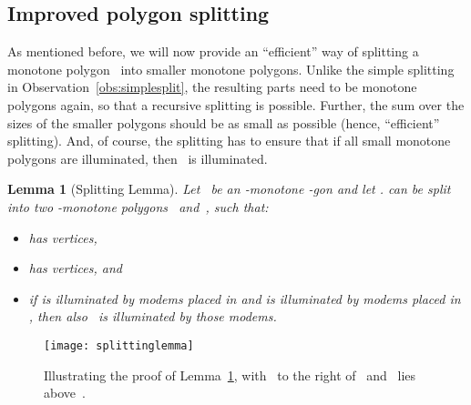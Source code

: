 \documentclass[A4]{article}
\newtheorem{lemma}[theorem]{Lemma}
\begin{document}
\subsection{Improved polygon splitting}
\label{sec:gmono-split}

As mentioned before, we will now provide an ``efficient'' way of splitting a monotone polygon~ into smaller monotone polygons.
Unlike the simple splitting in Observation~\ref{obs:simplesplit}, the resulting parts need to be monotone polygons again, so that a recursive splitting is possible.
Further, the sum over the sizes of the smaller polygons should be as small as possible (hence, ``efficient'' splitting).
And, of course, the splitting has to ensure that if all small monotone polygons are illuminated, then~ is illuminated.




\begin{lemma}[Splitting Lemma]\label{lem:splitting} Let~ be an -monotone -gon and let .
 can be split into two -monotone polygons~ and~, such that:
  \begin{itemize}
  \item  has  vertices,
  \item  has  vertices, and
  \item if  is illuminated by modems placed in  and  is illuminated by modems placed in , then also~ is illuminated by those modems.
  \end{itemize}
\end{lemma}

\begin{figure}[htb]
  \centering
  \texttt{[image: splittinglemma]}
  \caption{Illustrating the proof of Lemma~\ref{lem:splitting}, with~ to the right of~ and~ lies above~.}
  \label{fig:splittinglemma1}
\end{figure}
\end{document}
